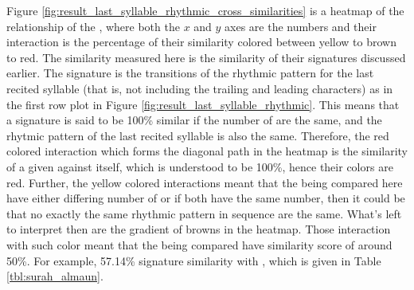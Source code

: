 Figure \ref{fig:result_last_syllable_rhythmic_cross_similarities} is a heatmap of the relationship of the  , where both the $x$ and $y$ axes are the   numbers and their interaction is the percentage of their similarity colored between yellow to brown to red. The similarity measured here is the similarity of their signatures discussed earlier. The signature is the transitions of the rhythmic pattern for the last recited syllable (that is, not including the trailing and leading characters) as in the first row plot in Figure \ref{fig:result_last_syllable_rhythmic}. This means that a signature is said to be 100\% similar if the number of   are the same, and the rhytmic pattern of the last recited syllable is also the same. Therefore, the red colored interaction which forms the diagonal path in the heatmap is the similarity of a given   against itself, which is understood to be 100\%, hence their colors are red. Further, the yellow colored interactions meant that the   being compared here have either differing number of   or if both have the same number, then it could be that no exactly the same rhythmic pattern in sequence are the same. What's left to interpret then are the gradient of browns in the heatmap. Those interaction with such color meant that the   being compared have similarity score of around 50\%. For example,   57.14\% signature similarity with  , which is given in Table \ref{tbl:surah_almaun}. 

